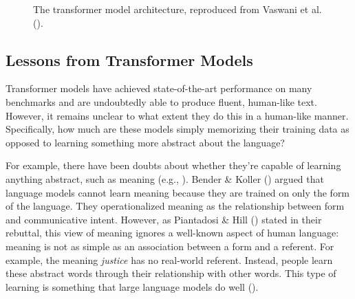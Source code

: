 \documentclass[
  12pt,
  letterpaper,
]{scrreport}
\begin{document}
\begin{figure}[t]

\caption{\label{fig-transformermodel}The transformer model architecture,
reproduced from Vaswani et al.
().}


\end{figure}%

\subsection{Lessons from Transformer
Models}\label{lessons-from-transformer-models}

Transformer models have achieved state-of-the-art performance on many
benchmarks and are undoubtedly able to produce fluent, human-like text.
However, it remains unclear to what extent they do this in a human-like
manner. Specifically, how much are these models simply memorizing their
training data as opposed to learning something more abstract about the
language?

For example, there have been doubts about whether they're capable of
learning anything abstract, such as meaning (e.g.,
).
Bender \& Koller ()
argued that language models cannot learn meaning because they are
trained on only the form of the language. They operationalized meaning
as the relationship between form and communicative intent. However, as
Piantadosi \& Hill
() stated in
their rebuttal, this view of meaning ignores a well-known aspect of
human language: meaning is not as simple as an association between a
form and a referent. For example, the meaning \emph{justice} has no
real-world referent. Instead, people learn these abstract words through
their relationship with other words. This type of learning is something
that large language models do well
().
\end{document}
